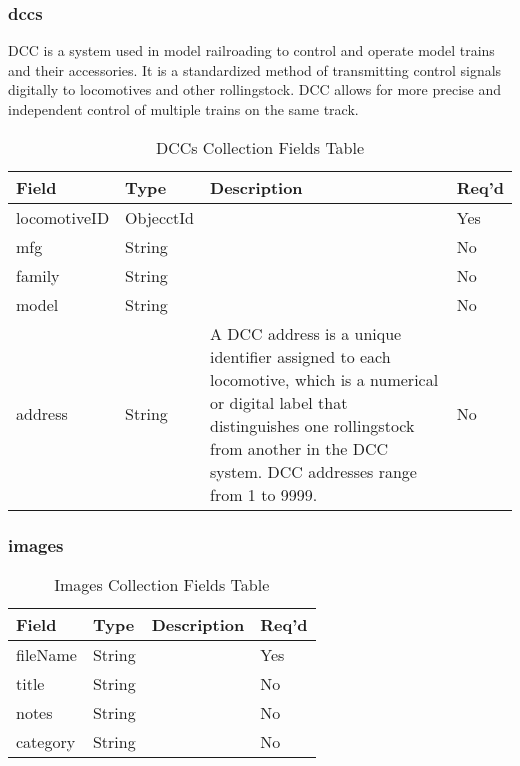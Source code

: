 \subsubsection{dccs}
\ac{DCC} is a system used in model railroading to control and operate model trains and their accessories. It is a standardized method of transmitting control signals digitally to locomotives and other rollingstock. \ac{DCC} allows for more precise and independent control of multiple trains on the same track.
\begin{table}[H]
    \begin{tabular}{|L{3cm}|L{1.7cm}|L{8.8cm}|L{1.3cm}|}
    \hline
        \textbf{Field} & \textbf{Type} & \textbf{Description} & \textbf{Req'd} \\ \hline
        locomotiveID & ObjecctId &  & Yes \\ \hline
        mfg & String & & No\\ \hline
        family & String & & No \\ \hline
        model &  String & & No \\ \hline
        address & String & A \ac{DCC} address is a unique identifier assigned to each locomotive, which is a numerical or digital label that distinguishes one rollingstock from another in the \ac{DCC} system. \ac{DCC} addresses range from 1 to 9999. & No \\ \hline
    \end{tabular}
    \caption{\label{dcc-table}\ac{DCC}s Collection Fields Table}
\end{table}
\subsubsection{images}
\begin{table}[H]
    \begin{tabular}{|L{3cm}|L{1.7cm}|L{8.8cm}|L{1.3cm}|}
    \hline
        \textbf{Field} & \textbf{Type} & \textbf{Description} & \textbf{Req'd} \\ \hline
        fileName & String &  & Yes \\ \hline
        title & String & & No\\ \hline
        notes & String & & No \\ \hline
        category &  String & & No \\ \hline
    \end{tabular}
    \caption{\label{image-table}Images Collection Fields Table}
    \end{table}
